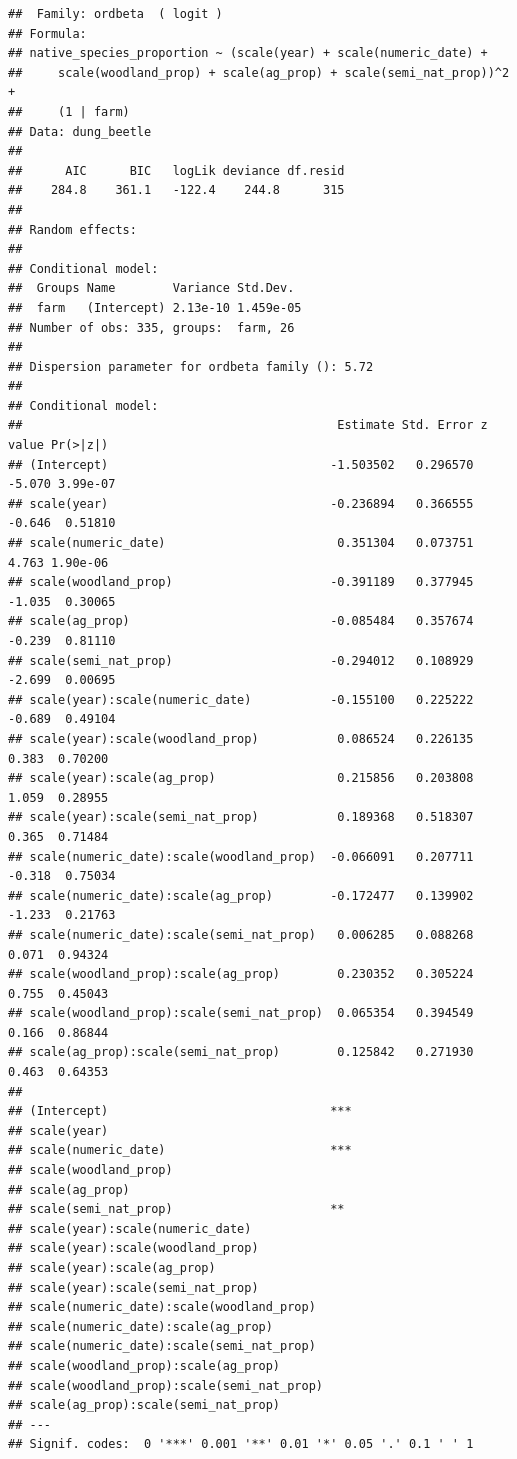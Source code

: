 \documentclass[
]{article}
\begin{document}
\begin{verbatim}
##  Family: ordbeta  ( logit )
## Formula:          
## native_species_proportion ~ (scale(year) + scale(numeric_date) +  
##     scale(woodland_prop) + scale(ag_prop) + scale(semi_nat_prop))^2 +  
##     (1 | farm)
## Data: dung_beetle
## 
##      AIC      BIC   logLik deviance df.resid 
##    284.8    361.1   -122.4    244.8      315 
## 
## Random effects:
## 
## Conditional model:
##  Groups Name        Variance Std.Dev. 
##  farm   (Intercept) 2.13e-10 1.459e-05
## Number of obs: 335, groups:  farm, 26
## 
## Dispersion parameter for ordbeta family (): 5.72 
## 
## Conditional model:
##                                            Estimate Std. Error z value Pr(>|z|)
## (Intercept)                               -1.503502   0.296570  -5.070 3.99e-07
## scale(year)                               -0.236894   0.366555  -0.646  0.51810
## scale(numeric_date)                        0.351304   0.073751   4.763 1.90e-06
## scale(woodland_prop)                      -0.391189   0.377945  -1.035  0.30065
## scale(ag_prop)                            -0.085484   0.357674  -0.239  0.81110
## scale(semi_nat_prop)                      -0.294012   0.108929  -2.699  0.00695
## scale(year):scale(numeric_date)           -0.155100   0.225222  -0.689  0.49104
## scale(year):scale(woodland_prop)           0.086524   0.226135   0.383  0.70200
## scale(year):scale(ag_prop)                 0.215856   0.203808   1.059  0.28955
## scale(year):scale(semi_nat_prop)           0.189368   0.518307   0.365  0.71484
## scale(numeric_date):scale(woodland_prop)  -0.066091   0.207711  -0.318  0.75034
## scale(numeric_date):scale(ag_prop)        -0.172477   0.139902  -1.233  0.21763
## scale(numeric_date):scale(semi_nat_prop)   0.006285   0.088268   0.071  0.94324
## scale(woodland_prop):scale(ag_prop)        0.230352   0.305224   0.755  0.45043
## scale(woodland_prop):scale(semi_nat_prop)  0.065354   0.394549   0.166  0.86844
## scale(ag_prop):scale(semi_nat_prop)        0.125842   0.271930   0.463  0.64353
##                                              
## (Intercept)                               ***
## scale(year)                                  
## scale(numeric_date)                       ***
## scale(woodland_prop)                         
## scale(ag_prop)                               
## scale(semi_nat_prop)                      ** 
## scale(year):scale(numeric_date)              
## scale(year):scale(woodland_prop)             
## scale(year):scale(ag_prop)                   
## scale(year):scale(semi_nat_prop)             
## scale(numeric_date):scale(woodland_prop)     
## scale(numeric_date):scale(ag_prop)           
## scale(numeric_date):scale(semi_nat_prop)     
## scale(woodland_prop):scale(ag_prop)          
## scale(woodland_prop):scale(semi_nat_prop)    
## scale(ag_prop):scale(semi_nat_prop)          
## ---
## Signif. codes:  0 '***' 0.001 '**' 0.01 '*' 0.05 '.' 0.1 ' ' 1
\end{verbatim}
\end{document}
